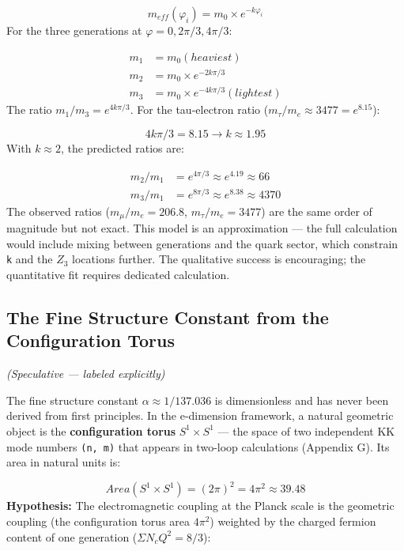 \documentclass[aps,prd,preprint,superscriptaddress,longbibliography,floatfix]{revtex4-2}
\theoremstyle{remark}
\begin{document}
\begin{equation}
    m_{eff}(\varphi_i) = m_{0} \times e^{-k \varphi_i}
\end{equation}
For the three generations at $\varphi = 0, 2\pi/3, 4\pi/3$:


\begin{align}
    m_{1} &= m_{0}                    (heaviest) \\
    m_{2} &= m_{0} \times e^{-2k\pi/3} \\
    m_{3} &= m_{0} \times e^{-4k\pi/3}      (lightest)
\end{align}
The ratio $m_{1}/m_{3} = e^{4k\pi/3}$. For the tau-electron ratio ($m_\tau/m_e \approx 3477 = e^{8.15}$):


\begin{equation}
    4k\pi/3 = 8.15  \to  k \approx 1.95
\end{equation}
With $k \approx 2$, the predicted ratios are:


\begin{align}
    m_{2}/m_{1} &= e^{4\pi/3} \approx e^{4.19} \approx 66 \\
    m_{3}/m_{1} &= e^{8\pi/3} \approx e^{8.38} \approx 4370
\end{align}
The observed ratios ($m_\mu/m_e = 206.8$, $m_\tau/m_e = 3477$) are the same order of magnitude but not exact. This model is an approximation --- the full calculation would include mixing between generations and the quark sector, which constrain \texttt{k} and the $Z_{3}$ locations further. The qualitative success is encouraging; the quantitative fit requires dedicated calculation.



\subsection{The Fine Structure Constant from the Configuration Torus}

\textit{(Speculative --- labeled explicitly)}

The fine structure constant $\alpha \approx 1/137.036$ is dimensionless and has never been derived from first principles. In the e-dimension framework, a natural geometric object is the \textbf{configuration torus} $S^{1} \times S^{1}$ --- the space of two independent KK mode numbers \texttt{(n, m)} that appears in two-loop calculations (Appendix G). Its area in natural units is:


\begin{equation}
    Area(S^{1} \times S^{1}) = (2\pi)^{2} = 4\pi^{2} \approx 39.48
\end{equation}
\textbf{Hypothesis:} The electromagnetic coupling at the Planck scale is the geometric coupling (the configuration torus area $4\pi^{2}$) weighted by the charged fermion content of one generation ($\Sigma N_c Q^{2} = 8/3$):
\end{document}
